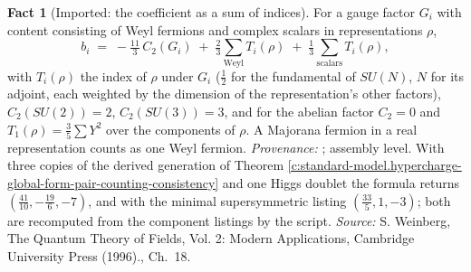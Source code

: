 \documentclass[11pt]{article}
\theoremstyle{definition}
\newtheorem{fact}[theorem]{Fact}
\theoremstyle{plain}
\begin{document}
\begin{fact}[Imported: the coefficient as a sum of indices]\label{c:standard-model.imported-coefficient-sum-indices}
For a gauge factor $G_{i}$ with content consisting of Weyl fermions and complex scalars in representations $\rho$,
\[
b_{i} \;=\; -\tfrac{11}{3}\,C_{2}(G_{i}) \;+\; \tfrac23 \sum_{\text{Weyl}} T_{i}(\rho) \;+\; \tfrac13 \sum_{\text{scalars}} T_{i}(\rho),
\]
with $T_{i}(\rho)$ the index of $\rho$ under $G_{i}$ ($\tfrac12$ for the fundamental of $SU(N)$, $N$ for its adjoint, each weighted by the dimension of the representation's other factors), $C_{2}(SU(2)) = 2$, $C_{2}(SU(3)) = 3$, and for the abelian factor $C_{2} = 0$ and $T_{1}(\rho) = \tfrac35 \sum Y^{2}$ over the components of $\rho$. A Majorana fermion in a real representation counts as one Weyl fermion. \emph{Provenance:} \cite[Ch.~18]{WeinbergQFT2}; assembly level. With three copies of the derived generation of Theorem \ref{c:standard-model.hypercharge-global-form-pair-counting-consistency} and one Higgs doublet the formula returns $(\tfrac{41}{10}, -\tfrac{19}{6}, -7)$, and with the minimal supersymmetric listing $(\tfrac{33}{5}, 1, -3)$; both are recomputed from the component listings by the script.
\emph{Source:} S. Weinberg, The Quantum Theory of Fields, Vol. 2: Modern Applications, Cambridge University Press (1996)., Ch.~18.
\end{fact}
\end{document}
